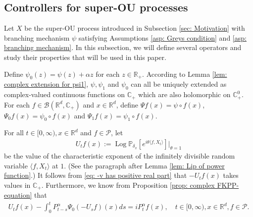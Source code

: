 \documentclass[12pt,a4paper]{amsart}
\theoremstyle{plain}
\theoremstyle{definition}
\numberwithin{equation}{section}
\begin{document}
\subsection{Controllers for super-OU processes}
\label{sec: h-controller}
Let $X$ be the super-OU process introduced in Subsection \ref{sec: Motivation} with branching mechanism $\psi$ satisfying
Assumptions \ref{asp: Greys condition} and \ref{asp: branching mechanism}.
In this subsection, we will define several operators and study their properties that will be used in this paper.

Define $\psi_0(z) = \psi(z) + \alpha z$ for each $z\in \mathbb{R}_+$.
According to Lemma \ref{lem: complex extension for psi1}, $\psi, \psi_1$ and $\psi_0$ can all be uniquely extended as complex-valued continuous functions on $\mathbb C_+$ which are also holomorphic on $\mathbb C^0_+$.
For each $f\in \mathcal B(\mathbb R^d, \mathbb C_+)$ and $x\in \mathbb R^d$, define
$\Psi f (x) = \psi\circ f(x)$, $\Psi_0 f(x)= \psi_0 \circ f(x)$ and $\Psi_1 f(x)= \psi_1 \circ f(x)$.

For all $t\in [0,\infty), x\in \mathbb R^d $ and $f \in \mathcal{P}$, let
\begin{align}
  \label{eq: def of U_t}
  U_tf(x) 
  := \operatorname{Log} \mathbb P_{\delta_x}[e^{i\theta \langle f, X_t\rangle}]|_{\theta = 1}
\end{align}
be the value of the characteristic exponent of the infinitely divisible random variable $\langle f, X_t\rangle$ at $1$.
(See the paragraph after Lemma \ref{lem: Lip of power function}.)
It follows from \eqref{eq: -v has positive real part} that $-U_tf(x)$ takes values in $\mathbb C_+$. Furthermore, we know from Proposition \ref{prop: complex FKPP-equation} that
\begin{align}
  \label{eq:chareq2}
  U_tf(x) - \int_0^t P^\alpha_{t-s} \Psi_0(-U_sf)(x)ds
  = i P^{\alpha}_t f(x)
  , \quad t\in [0,\infty), x\in \mathbb{R}^d, f\in \mathcal P.
\end{align}
\end{document}
